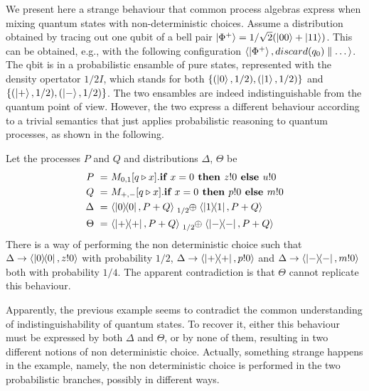 We present here a strange behaviour that common process algebras express when mixing quantum states with non-deterministic choices.
Assume a distribution obtained by tracing out one qubit of a bell pair $\ket{\Phi^+} = 1/\sqrt{2}(\ket{00} + \ket{11})$.
This can be obtained, e.g., with the following configuration $\langle\ket{\Phi^+}, discard(q_0) \parallel \dots\rangle$.
The qbit is in a probabilistic ensamble of pure states, represented with the density opertator $1/2 I$, which stands for both $\{(\ket{0}, 1/2), (\ket{1}, 1/2)\}$ and $\{(\ket{+}, 1/2), (\ket{-}, 1/2)\}$.
The two ensambles are indeed indistinguishable from the quantum point of view.
However, the two express a different behaviour according to a trivial semantics that just applies probabilistic reasoning to quantum processes, as shown in the following.
\begin{example}
	Let the processes $P$ and $Q$ and distributions $\Delta$, $\Theta$ be
	\begin{align*}
		P\ =\ &M_{0,1}[q \triangleright x] . \ite{x=0}{z!0}{u!0}\\
		Q\ =\ &M_{+,-}[q \triangleright x] . \ite{x=0}{p!0}{m!0}\\
		\Delta\ =\ &\confw{\ketbra{0}{0}, P + Q} \psum{1/2} \confw{\ketbra{1}{1}, P + Q}\\
		\Theta\ =\ &\confw{\ketbra{+}{+}, P + Q} \psum{1/2} \confw{\ketbra{-}{-}, P + Q}
	\end{align*}
	There is a way of performing the non deterministic choice such that $\Delta \rightarrow \langle\ket{0}\!\!\bra{0}, z!0\rangle$ with probability $1/2$, $\Delta \rightarrow \langle\ket{+}\!\!\bra{+}, p!0\rangle$ and $\Delta \rightarrow \langle\ket{-}\!\!\bra{-}, m!0\rangle$ both with probability $1/4$.
	The apparent contradiction is that $\Theta$ cannot replicate this behaviour.
\end{example}

Apparently, the previous example seems to contradict the common understanding of indistinguishability of quantum states.
To recover it, either this behaviour must be expressed by both $\Delta$ and $\Theta$, or by none of them, resulting in two different notions of non deterministic choice.
Actually, something strange happens in the example, namely, the non deterministic choice is performed in the two probabilistic branches, possibly in different ways.
